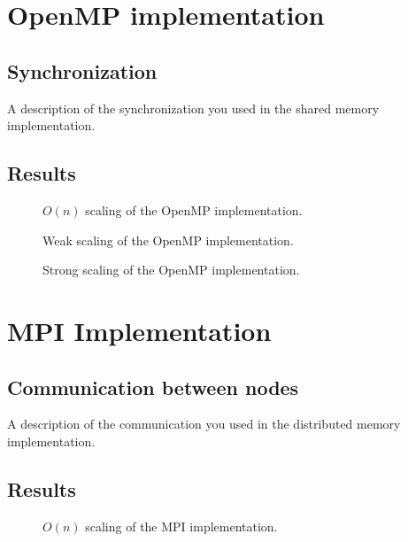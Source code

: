 \documentclass[12pt]{article}
\begin{document}
\section{OpenMP implementation}

\subsection{Synchronization}
A description of the synchronization you used in the shared memory implementation.

\subsection{Results}

\begin{figure}
  \caption{$O(n)$ scaling of the OpenMP implementation.}
  \label{fig:openmp-on}
\end{figure}

\begin{figure}
  \caption{Weak scaling of the OpenMP implementation.}
  \label{fig:openmp-weak}
\end{figure}

\begin{figure}
  \caption{Strong scaling of the OpenMP implementation.}
  \label{fig:openmp-strong}
\end{figure}

\section{MPI Implementation}

\subsection{Communication between nodes}
A description of the communication you used in the distributed memory implementation.

\subsection{Results}

\begin{figure}
  \caption{$O(n)$ scaling of the MPI implementation.}
  \label{fig:mpi-on}
\end{figure}
\end{document}
